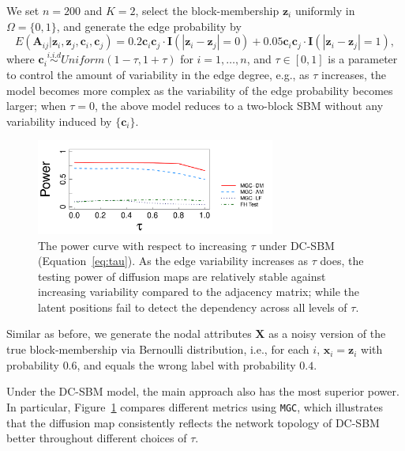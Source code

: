 \documentclass[12pt]{article}
\theoremstyle{definition}
\begin{document}
	We set $n=200$ and $K=2$, select the block-membership $\mathbf{z}_i$ uniformly in $\Omega=\{0,1\}$, and generate the edge probability by  
	\vspace*{-0.4cm}
	\begin{equation}
	E( \mathbf{A}_{ij} | \mathbf{z}_{i}, \mathbf{z}_{j},\mathbf{c}_{i},\mathbf{c}_{j} )  = 0.2 \mathbf{c}_{i} \mathbf{c}_{j} \cdot \mathbf{I}( |\mathbf{z}_{i} - \mathbf{z}_{j}| = 0 ) + 0.05 \mathbf{c}_{i} \mathbf{c}_{j} \cdot \mathbf{I}(|\mathbf{z}_{i} - \mathbf{z}_{j}| = 1),
	\label{eq:tau}
	\end{equation} 
	where $\mathbf{c}_{i} \overset{i.i.d}{\sim} Uniform(1 - \tau, 1 + \tau)$ for $i = 1, \ldots, n$, and $\tau \in [0, 1]$ is a parameter to control the amount of variability in the edge degree, e.g., as $\tau$ increases, the model becomes more complex as the variability of the edge probability becomes larger; when $\tau=0$, the above model reduces to a two-block SBM without any variability induced by $\{ \mathbf{c}_{i} \}$. 
	
	\begin{figure}[ht]
		\centering
		\includegraphics[width=0.7\textwidth]{../Figure/elbow3_dcSBM.pdf}
		\caption{The power curve with respect to increasing $\tau$ under DC-SBM (Equation~\ref{eq:tau}). As the edge variability increases as $\tau$ does, the testing power of diffusion maps are relatively stable against increasing variability compared to the adjacency matrix; while the latent positions fail to detect the dependency across all levels of $\tau$.}
		\label{fig:tau}
	\end{figure}
	
	Similar as before, we generate the nodal attributes $\mathbf{X}$ as a noisy version of the true block-membership via Bernoulli distribution, i.e., for each $i$, $\mathbf{x}_{i}= \mathbf{z}_{i}$ with probability $0.6$, and equals the wrong label with probability $0.4$.
	
	Under the DC-SBM model, the main approach also has the most superior power. In particular, Figure~\ref{fig:tau} compares different metrics using \texttt{MGC}, which illustrates that the diffusion map consistently reflects the network topology of DC-SBM better throughout different choices of $\tau$.
	
\end{document}
